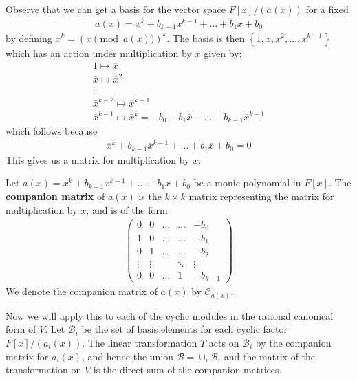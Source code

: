 \documentclass{memoir}
\begin{document}
Observe that we can get a basis for the vector space \(F[x] / (a(x))\) for a fixed
\begin{align*}
	a(x) = x^{k}+ b_{k-1}x^{k-1} + \ldots + b_1 x + b_0
\end{align*}
by defining \(\overline{x}^{k}= (x \pmod{a(x)})^{k}\). The basis is then \(\left\{ 1,\overline{x},\overline{x}^2,\ldots,\overline{x}^{k-1} \right\} \) which has an action under multiplication by \(x\) given by:
\begin{align*}
	1 \mapsto \overline{x}\\
	\overline{x} \mapsto \overline{x}^2\\
	\vdots\\
	\overline{x}^{k-2}\mapsto \overline{x}^{k-1}\\
	\overline{x}^{k-1}\mapsto \overline{x}^{k} = -b_0 - b_1\overline{x} - \ldots - b_{k-1}\overline{x}^{k-1}
\end{align*}
which follows because
\begin{align*}
	\overline{x}^{k} + b_{k-1}\overline{x}^{k-1} + \ldots + b_1\overline{x}+b_0 = 0
\end{align*}
This gives us a matrix for multiplication by \(x\):
\begin{defn}
	Let \(a(x) = x^{k}+ b_{k-1}x^{k-1}+ \ldots + b_1x + b_0\) be a monic polynomial in \(F[x]\). The \textbf{companion matrix} of \(a(x)\) is the \(k\times k\) matrix representing the matrix for multiplication by \(x\), and is of the form
	\begin{align*}
		\begin{pmatrix} 
			0 & 0 & \ldots & \ldots & -b_0\\
			1 & 0 & \ldots & \ldots & -b_1 \\
			0 & 1 & \ldots & \ldots & -b_2\\
			\vdots & \vdots &   & \ddots & \vdots\\
			0 & 0 & \ldots & 1 & -b_{k-1}
	\end{pmatrix}
	\end{align*}
	We denote the companion matrix of \(a(x)\) by \(\mathcal{C}_{a(x)}\).
\end{defn}

Now we will apply this to each of the cyclic modules in the rational canonical form of \(V\). Let \(\mathcal{B}_i\) be the set of basis elements for each cyclic factor \(F[x] / (a_i(x))\). The linear transformation \(T\) acts on \(\mathcal{B}_i\) by the companion matrix for \(a_i(x)\), and hence the union \(\mathcal{B} = \cup_{i} \mathcal{B}_i\) and the matrix of the transformation on \(V\) is the direct sum of the companion matrices.
\end{document}
